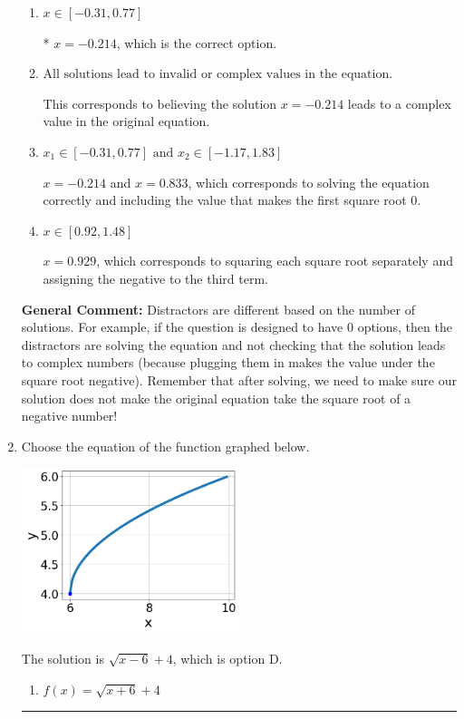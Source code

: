 \documentclass{extbook}[14pt]
\newcommand{\litem}[1]{\item #1

\rule{\textwidth}{0.4pt}}
\begin{document}
\begin{enumerate}
{\begin{enumerate}[label=\Alph*.]
$x = -1.000$ and $x = 0.833$, which corresponds to solving each radical separately for 0.
\item \( x \in [-0.31,0.77] \)

* $x = -0.214$, which is the correct option.
\item \( \text{All solutions lead to invalid or complex values in the equation.} \)

This corresponds to believing the solution $x = -0.214$ leads to a complex value in the original equation.
\item \( x_1 \in [-0.31, 0.77] \text{ and } x_2 \in [-1.17,1.83] \)

$x = -0.214$ and $x = 0.833$, which corresponds to solving the equation correctly and including the value that makes the first square root 0.
\item \( x \in [0.92,1.48] \)

$x = 0.929$, which corresponds to squaring each square root separately and assigning the negative to the third term.
\end{enumerate}

\textbf{General Comment:} Distractors are different based on the number of solutions. For example, if the question is designed to have 0 options, then the distractors are solving the equation and not checking that the solution leads to complex numbers (because plugging them in makes the value under the square root negative). Remember that after solving, we need to make sure our solution does not make the original equation take the square root of a negative number!
}
\litem{
Choose the equation of the function graphed below.

\begin{center}
    \includegraphics[width=0.5\textwidth]{../Figures/radicalGraphToEquationCopyB.png}
\end{center}


The solution is \( \sqrt{x - 6} + 4 \), which is option D.\begin{enumerate}[label=\Alph*.]
\item \( f(x) = \sqrt{x + 6} + 4 \)


\end{enumerate}}
\end{enumerate}
\end{document}
